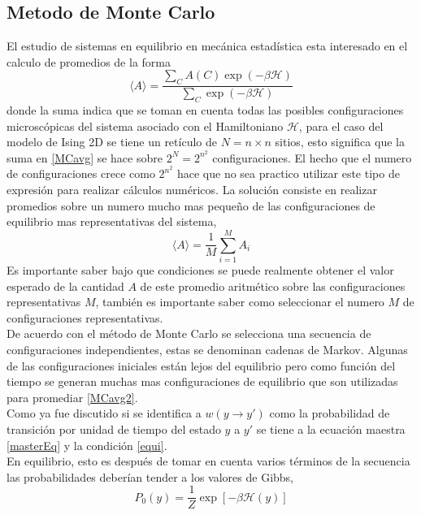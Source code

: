 \documentclass[a4paper]{article}
\begin{document}
\subsection{Metodo de Monte Carlo}
El estudio de sistemas en equilibrio en mecánica estadística  esta interesado en el calculo de promedios de la forma
\begin{equation}\label{MCavg}
\langle A\rangle=\frac{\displaystyle \sum_{C} A(C) \exp(-\beta\mathcal{H})}{\displaystyle\sum_{C} \exp(-\beta\mathcal{H})}
\end{equation}
donde  la suma indica que se toman en cuenta todas las posibles configuraciones microscópicas del sistema asociado con el Hamiltoniano $\mathcal{H}$, para el caso del modelo de Ising 2D se tiene un retículo de $N=n\times n$ sitios, esto significa que la suma en \ref{MCavg} se hace sobre $2^N=2^{n^2}$ configuraciones. El hecho que el numero de configuraciones crece como $2^{n^2}$ hace que no sea practico utilizar este tipo de expresión para realizar cálculos numéricos. La solución consiste en realizar promedios sobre un numero mucho mas pequeño de las configuraciones de equilibrio mas representativas  del sistema,
\begin{equation}\label{MCavg2}
\langle A\rangle=\frac{1}{M}\sum^M_{i=1}A_i
\end{equation}
Es importante saber bajo que condiciones se puede realmente obtener el valor esperado de la cantidad $A$ de este promedio aritmético sobre las configuraciones representativas $M$, también es importante saber como seleccionar el numero $M$ de configuraciones representativas. \\
De acuerdo con el método de Monte Carlo se selecciona una secuencia de configuraciones independientes, estas se denominan cadenas de Markov. Algunas de las configuraciones iniciales están lejos del equilibrio pero como función del tiempo se generan muchas mas configuraciones de equilibrio que son utilizadas para promediar \ref{MCavg2}.\\
Como ya fue discutido si se identifica a $w(y\rightarrow y')$ como la probabilidad de transición por unidad de tiempo del estado $y$ a $y'$ se tiene a la ecuación maestra \ref{masterEq} y la condición \ref{equi}.\\
En equilibrio, esto es después de tomar en cuenta varios términos de la secuencia las probabilidades deberían tender a los valores de Gibbs,
\begin{equation}
P_0(y)=\frac{1}{Z}\exp[-\beta\mathcal{H}(y)]
\end{equation}
\end{document}
